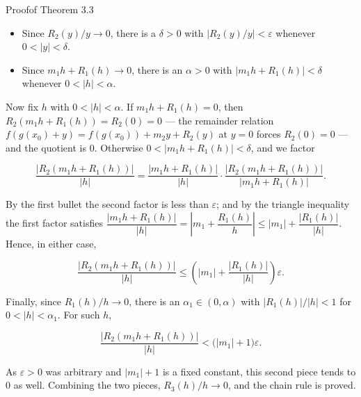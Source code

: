 \begin{hkproof}{Proof}{}{of Theorem 3.3}
\begin{itemize}
  \item Since \(R_{2}(y)/y \to 0\), there is a \(\delta > 0\) with \(\left\lvert R_{2}(y)/y \right\rvert < \varepsilon\) whenever \(0 < \lvert y \rvert < \delta\).
  \item Since \(m_{1} h + R_{1}(h) \to 0\), there is an \(\alpha > 0\) with \(\lvert m_{1} h + R_{1}(h) \rvert < \delta\) whenever \(0 < \lvert h \rvert < \alpha\).
\end{itemize}
Now fix \(h\) with \(0 < \lvert h \rvert < \alpha\). If \(m_{1} h + R_{1}(h) = 0\), then \(R_{2}(m_{1} h + R_{1}(h)) = R_{2}(0) = 0\) — the remainder relation \(f(g(x_{0}) + y) = f(g(x_{0})) + m_{2} y + R_{2}(y)\) at \(y = 0\) forces \(R_{2}(0) = 0\) — and the quotient is \(0\). Otherwise \(0 < \lvert m_{1} h + R_{1}(h) \rvert < \delta\), and we factor

\[ \frac{\lvert R_{2}(m_{1} h + R_{1}(h)) \rvert}{\lvert h \rvert} = \frac{\lvert m_{1} h + R_{1}(h) \rvert}{\lvert h \rvert} \cdot \frac{\lvert R_{2}(m_{1} h + R_{1}(h)) \rvert}{\lvert m_{1} h + R_{1}(h) \rvert}. \]

By the first bullet the second factor is less than \(\varepsilon\); and by the triangle inequality the first factor satisfies \(\dfrac{\lvert m_{1} h + R_{1}(h) \rvert}{\lvert h \rvert} = \left\lvert m_{1} + \dfrac{R_{1}(h)}{h} \right\rvert \le \lvert m_{1} \rvert + \dfrac{\lvert R_{1}(h) \rvert}{\lvert h \rvert}\). Hence, in either case,

\[ \frac{\lvert R_{2}(m_{1} h + R_{1}(h)) \rvert}{\lvert h \rvert} \le \left( \lvert m_{1} \rvert + \frac{\lvert R_{1}(h) \rvert}{\lvert h \rvert} \right)\varepsilon. \]

Finally, since \(R_{1}(h)/h \to 0\), there is an \(\alpha_{1} \in (0, \alpha)\) with \(\lvert R_{1}(h) \rvert/\lvert h \rvert < 1\) for \(0 < \lvert h \rvert < \alpha_{1}\). For such \(h\),

\[ \frac{\lvert R_{2}(m_{1} h + R_{1}(h)) \rvert}{\lvert h \rvert} < \bigl( \lvert m_{1} \rvert + 1 \bigr)\varepsilon. \]

As \(\varepsilon > 0\) was arbitrary and \(\lvert m_{1} \rvert + 1\) is a fixed constant, this second piece tends to \(0\) as well. Combining the two pieces, \(R_{3}(h)/h \to 0\), and the chain rule is proved.
\end{hkproof}
